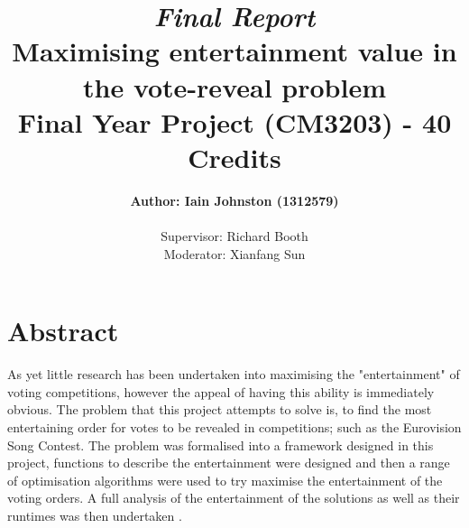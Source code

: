 \documentclass[12pt]{report}
\title{\textit{Final Report}\\\textbf{Maximising entertainment value in the vote-reveal problem}\\ Final Year Project (CM3203) - 40 Credits}
\author{\textbf{Author: Iain Johnston (1312579)} \\ \\ Supervisor: Richard Booth\\ Moderator: Xianfang Sun}
\date{} %
\begin{document}
\maketitle
\clearpage

\section*{Abstract}
As yet little research has been undertaken into maximising the "entertainment" of voting competitions, however the appeal of having this ability is immediately obvious.
The problem that this project attempts to solve is, to find the most entertaining order for votes to be revealed in competitions; such as the Eurovision Song Contest.
The problem was formalised into a framework designed in this project, functions to describe the entertainment were designed and then a range of optimisation algorithms were used to try maximise the entertainment of the voting orders. A full analysis of the entertainment of the solutions as well as their runtimes was then undertaken .
\end{document}
